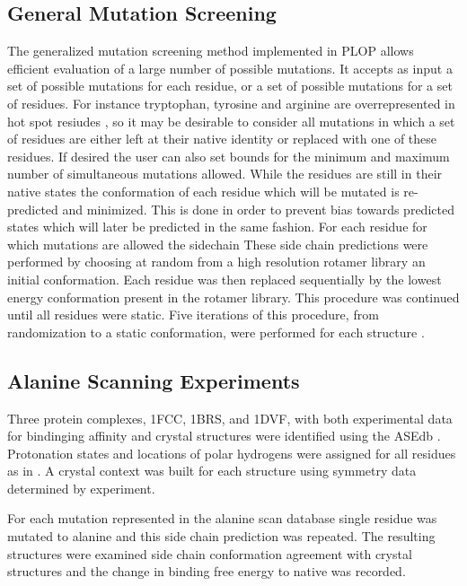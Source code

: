 \subsection{General Mutation Screening}
The generalized mutation screening method implemented in PLOP allows efficient evaluation of a large number of possible mutations.
It accepts as input a set of possible mutations for each residue, or a set of possible mutations for a set of residues.
For instance tryptophan, tyrosine and arginine are overrepresented in hot spot resiudes \cite{hu2000conservation}, so it may be desirable to consider all mutations in which a set of residues are either left at their native identity or replaced with one of these residues.
If desired the user can also set bounds for the minimum and maximum number of simultaneous mutations allowed.
While the residues are still in their native states the conformation of each residue which will be mutated is re-predicted and minimized.
This is done in order to prevent bias towards predicted states which will later be predicted in the same fashion.
For each residue for which mutations are allowed the sidechain 
These side chain predictions were performed by choosing at random from a high resolution rotamer library an initial conformation.
Each residue was then replaced sequentially by the lowest energy conformation present in the rotamer library.
This procedure was continued until all residues were static.
Five iterations of this procedure, from randomization to a static conformation, were performed for each structure \cite{jacobson2002force,jacobson2002role}.




\subsection{Alanine Scanning Experiments}
Three protein complexes, 1FCC, 1BRS, and 1DVF, with both experimental data for bindinging affinity and crystal structures were identified using the ASEdb \cite{thorn2001asedb}.
Protonation states and locations of polar hydrogens were assigned for all residues as in \cite{li2007assignment}.
A crystal context was built for each structure using symmetry data determined by experiment.

For each mutation represented in the alanine scan database single residue was mutated to alanine and this side chain prediction was repeated.
The resulting structures were examined side chain conformation agreement with crystal structures and the change in binding free energy to native was recorded. 
